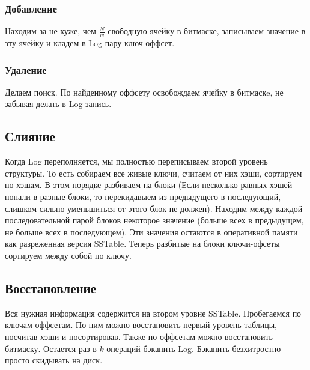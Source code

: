       \subsubsection*{Добавление}
        Находим за не хуже, чем $\frac{N}{w}$ свободную ячейку в битмаске, записываем значение в эту ячейку и кладем в Log пару ключ-оффсет.

      \subsubsection*{Удаление}
        Делаем поиск. По найденному оффсету освобождаем ячейку в битмаскe, не забывая делать в Log запись.

      \subsection*{Слияние}
        Когда Log переполняется, мы полностью переписываем второй уровень структуры. То есть собираем все живые ключи, считаем от них хэши, сортируем по хэшам. В этом порядке разбиваем на блоки (Если несколько равных хэшей попали в разные блоки, то перекидавыем из предыдущего в последующий, слишком сильно уменьшиться от этого блок не должен). Находим между каждой последовательной парой блоков некоторое значение (больше всех в предыдущем, не больше всех в последующем). Эти значения остаются в оперативной памяти как разреженная версия SSTable. Теперь разбитые на блоки ключи-офсеты сортируем между собой по ключу.

      \subsection*{Восстановление}
        Вся нужная информация содержится на втором уровне SSTable. Пробегаемся по ключам-оффсетам. По ним можно восстановить первый уровень таблицы, посчитав хэши и посортировав. Также по оффсетам можно 
        восстановить битмаску. Остается раз в $k$ операций бэкапить Log. Бэкапить безхитростно - просто скидывать на диск.
